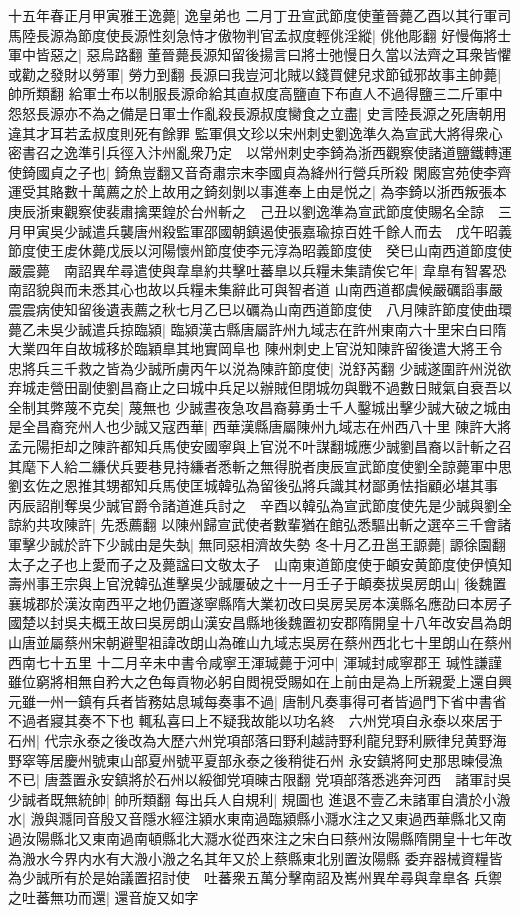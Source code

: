 十五年春正月甲寅雅王逸薨|{
	逸皇弟也}
二月丁丑宣武節度使董晉薨乙酉以其行軍司馬陸長源為節度使長源性刻急恃才傲物判官孟叔度輕佻淫縱|{
	佻他彫翻}
好慢侮將士軍中皆惡之|{
	惡烏路翻}
董晉薨長源知留後揚言曰將士弛慢日久當以法齊之耳衆皆懼或勸之發財以勞軍|{
	勞力到翻}
長源曰我豈河北賊以錢買健兒求節钺邪故事主帥薨|{
	帥所類翻}
給軍士布以制服長源命給其直叔度高鹽直下布直人不過得鹽三二斤軍中怨怒長源亦不為之備是日軍士作亂殺長源叔度臠食之立盡|{
	史言陸長源之死唐朝用違其才耳若孟叔度則死有餘罪}
監軍俱文珍以宋州刺史劉逸準久為宣武大將得衆心密書召之逸準引兵徑入汴州亂衆乃定　以常州刺史李錡為浙西觀察使諸道鹽鐵轉運使錡國貞之子也|{
	錡魚豈翻又音奇肅宗末李國貞為絳州行營兵所殺}
閑廄宫苑使李齊運受其賂數十萬薦之於上故用之錡刻剝以事進奉上由是悦之|{
	為李錡以浙西叛張本}
庚辰浙東觀察使裴肅擒栗鍠於台州斬之　己丑以劉逸準為宣武節度使賜名全諒　三月甲寅吳少誠遣兵襲唐州殺監軍邵國朝鎮遏使張嘉瑜掠百姓千餘人而去　戊午昭義節度使王䖍休薨戊辰以河陽懷州節度使李元淳為昭義節度使　癸巳山南西道節度使嚴震薨　南詔異牟尋遣使與韋臯約共擊吐蕃臯以兵糧未集請俟它年|{
	韋臯有智畧恐南詔貌與而未悉其心也故以兵糧未集辭此可與智者道}
山南西道都虞候嚴礪謟事嚴震震病使知留後遺表薦之秋七月乙巳以礪為山南西道節度使　八月陳許節度使曲環薨乙未吳少誠遣兵掠臨潁|{
	臨潁漢古縣唐屬許州九域志在許州東南六十里宋白曰隋大業四年自故城移於臨穎臯其地實岡阜也}
陳州刺史上官涚知陳許留後遣大將王令忠將兵三千救之皆為少誠所虜丙午以涚為陳許節度使|{
	涚舒芮翻}
少誠遂圍許州涚欲弃城走營田副使劉昌裔止之曰城中兵足以辦賊但閉城勿與戰不過數日賊氣自衰吾以全制其弊蔑不克矣|{
	蔑無也}
少誠晝夜急攻昌裔募勇士千人鑿城出擊少誠大破之城由是全昌裔兖州人也少誠又寇西華|{
	西華漢縣唐屬陳州九域志在州西八十里}
陳許大將孟元陽拒却之陳許都知兵馬使安國寧與上官涚不叶謀翻城應少誠劉昌裔以計斬之召其麾下人給二縑伏兵要巷見持縑者悉斬之無得脱者庚辰宣武節度使劉全諒薨軍中思劉玄佐之恩推其甥都知兵馬使匡城韓弘為留後弘將兵識其材鄙勇怯指顧必堪其事　丙辰詔削奪吳少誠官爵令諸道進兵討之　辛酉以韓弘為宣武節度使先是少誠與劉全諒約共攻陳許|{
	先悉薦翻}
以陳州歸宣武使者數輩猶在館弘悉驅出斬之選卒三千會諸軍擊少誠於許下少誠由是失埶|{
	無同惡相濟故失勢}
冬十月乙丑邕王謜薨|{
	謜徐園翻}
太子之子也上愛而子之及薨諡曰文敬太子　山南東道節度使于頔安黄節度使伊慎知壽州事王宗與上官涗韓弘進擊吳少誠屢破之十一月壬子于頔奏拔吳房朗山|{
	後魏置襄城郡於漢汝南西平之地仍置遂寧縣隋大業初改曰吳房吴房本漢縣名應劭曰本房子國楚以封吳夫概王故曰吳房朗山漢安昌縣地後魏置初安郡隋開皇十八年改安昌為朗山唐並屬蔡州宋朝避聖祖諱改朗山為確山九域志吳房在蔡州西北七十里朗山在蔡州西南七十五里}
十二月辛未中書令咸寧王渾瑊薨于河中|{
	渾瑊封咸寧郡王}
瑊性謙謹雖位窮將相無自矜大之色每貢物必躬自閲視受賜如在上前由是為上所親愛上還自興元雖一州一鎮有兵者皆務姑息瑊每奏事不過|{
	唐制凡奏事得可者皆過門下省中書省不過者寢其奏不下也}
輒私喜曰上不疑我故能以功名終　六州党項自永泰以來居于石州|{
	代宗永泰之後改為大歷六州党項部落曰野利越詩野利龍兒野利厥律兒黄野海野窣等居慶州號東山部夏州號平夏部永泰之後稍徙石州}
永安鎮將阿史那思暕侵漁不已|{
	唐蓋置永安鎮將於石州以綏御党項暕古限翻}
党項部落悉逃奔河西　諸軍討吳少誠者既無統帥|{
	帥所類翻}
每出兵人自規利|{
	規圖也}
進退不壹乙未諸軍自潰於小溵水|{
	溵與㶏同音殷又音隱水經注潁水東南過臨潁縣小㶏水注之又東過西華縣北又南過汝陽縣北又東南過南頓縣北大㶏水從西來注之宋白曰蔡州汝陽縣隋開皇十七年改為溵水今界内水有大溵小溵之名其年又於上蔡縣東北别置汝陽縣}
委弃器械資糧皆為少誠所有於是始議置招討使　吐蕃衆五萬分擊南詔及嶲州異牟尋與韋臯各兵禦之吐蕃無功而還|{
	還音旋又如字}



